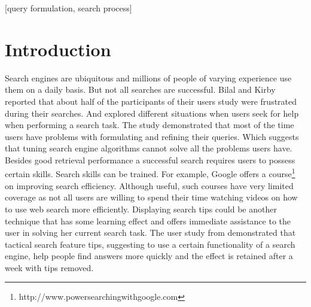 \documentclass{sig-alternate}
\begin{document}
\maketitle
\begin{abstract}
Research has found that the majority of cases when search engine users require assistance comes from the query formulation and refinement stages.
Providing users with tactical search feature tips was previously shown to increase search success rate and to have some educational effect.
In this paper we extend the study of the effect of search tips and focus on strategic tips, suggesting users a divide-and-conquer algorithm for solving difficult informational search tasks.
We prepared two sets of tips: task-specific, tailored to a particular search question and generic, describing a search strategy in general. 
The results of the conducted user study demonstrate the effectiveness of good search tips on search success rate.
However, tips that are too general and hard to follow can also be detrimental.
\end{abstract}

[query formulation, search process]



\section{Introduction}
Search engines are ubiquitous and millions of people of varying experience use them on a daily basis.
But not all searches are successful.
Bilal and Kirby \cite{Bilal:2002:DSI:637512.637516} reported that about half of the participants of their users study were frustrated during their searches.
And \cite{xie2009understanding} explored different situations when users seek for help when performing a search task.
The study demonstrated that most of the time users have problems with formulating and refining their queries.
Which suggests that tuning search engine algorithms cannot solve all the problems users have.
Besides good retrieval performance a successful search requires users to possess certain skills.
Search skills can be trained. For example, Google offers a course\footnote{http://www.powersearchingwithgoogle.com} on improving search efficiency.
Although useful, such courses have very limited coverage as not all users are willing to spend their time watching videos on how to use web search more efficiently. 
Displaying search tips could be another technique that has some learning effect and offers immediate assistance to the user in solving her current search task.
The user study from \cite{Moraveji:2011:MIU:2009916.2009966} demonstrated that tactical search feature tips, suggesting to use a certain functionality of a search engine, help people find answers more quickly and the effect is retained after a week with tips removed.
\end{document}
